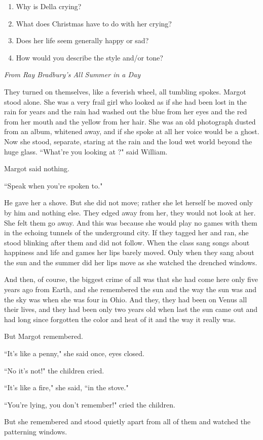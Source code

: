 \begin{enumerate}
\item Why is Della crying?
\vfill\item What does Christmas have to do with her crying?  
\vfill\item Does her life seem generally happy or sad?  
\vfill\item How would you describe the style and/or tone?
\end{enumerate}

\vfill

\newpage
\textit{From Ray Bradbury's All Summer in a Day}

\bigskip
\begin{linenumbers*}
\modulolinenumbers[5]
\indent They turned on themselves, like a feverish wheel, all tumbling spokes. Margot stood alone. She was a very frail girl who looked as if she had been lost in the rain for years and the rain had washed out the blue from her eyes and the red from her mouth and the yellow from her hair. She was an old photograph dusted from an album, whitened away, and if she spoke at all her voice would be a ghost. Now she stood, separate, staring at the rain and the loud wet world beyond the huge glass.
``What're you looking at ?" said William.

Margot said nothing.

``Speak when you're spoken to."

\indent He gave her a shove. But she did not move; rather she let herself be moved only by him and nothing else. They edged away from her, they would not look at her. She felt them go away. And this was because she would play no games with them in the echoing tunnels of the underground city. If they tagged her and ran, she stood blinking after them and did not follow. When the class sang songs about happiness and life and games her lips barely moved. Only when they sang about the sun and the summer did her lips move as she watched the drenched windows.

\indent And then, of course, the biggest crime of all was that she had come here only five years ago from Earth, and she remembered the sun and the way the sun was and the sky was when she was four in Ohio. And they, they had been on Venus all their lives, and they had been only two years old when last the sun came out and had long since forgotten the color and heat of it and the way it really was.

\indent But Margot remembered.

\indent ``It's like a penny," she said once, eyes closed.

\indent ``No it's not!" the children cried.

\indent ``It's like a fire," she said, ``in the stove."

\indent ``You're lying, you don't remember!" cried the children.

\indent But she remembered and stood quietly apart from all of them and watched the patterning windows. 
\end{linenumbers*}

